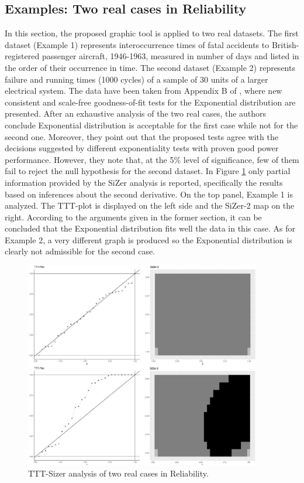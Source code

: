 \documentclass[preprint,12pt]{elsarticle}
\begin{document}
\subsection{Examples: Two real cases in Reliability}
In this section, the proposed graphic tool is applied to two real datasets. The first dataset (Example 1) represents interoccurrence
times of fatal accidents to British-registered passenger aircraft, 1946-1963, measured in number of days and listed in the order of their occurrence in time. The second dataset (Example 2) represents failure and running times (1000 cycles) of a sample of 30 units of a larger electrical system. The data have been taken from Appendix B of \cite{CMO2019}, where new consistent and scale-free goodness-of-fit tests for the Exponential distribution are presented. After an exhaustive analysis of the two real cases, the
authors conclude Exponential distribution is acceptable for the first case while not for the second one. Moreover, they point out that the proposed tests agree with the decisions suggested by different exponentiality tests with proven good power performance. However, they note that, at the 5\% level of significance, few of them fail to reject the null hypothesis for the second dataset.
In Figure \ref{Fig:2reliab_data} only partial information  provided by the SiZer analysis is reported, specifically the results based on inferences about the second derivative. On the top panel,  Example 1 is analyzed. The TTT-plot is displayed on the left side and the SiZer-2 map on the right. According to the arguments given in the former section, it can be concluded that the Exponential distribution fits well the data in this case. 
As for Example 2, a very different graph is produced so the Exponential distribution is clearly not admissible for the second case.

\begin{figure}[htb]
\begin{center}
\includegraphics[height=9cm]{Fig3_twosamplestogether}
\caption{TTT-Sizer analysis of two real cases in Reliability.}\label{Fig:2reliab_data}
\end{center}
\end{figure}
\end{document}
